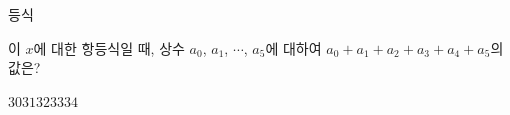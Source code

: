 등식\par\smallskip{}\par\smallskip\noindent 이 $x$에 대한 항등식일 때, 상수 $a_0$, $a_1$, $\cdots$, $a_5$에 대하여 $a_0+a_1+a_2+a_3+a_4+a_5$의 값은?
\begin{choices32}{$30$}{$31$}{$32$}{$33$}{$34$}\end{choices32}
